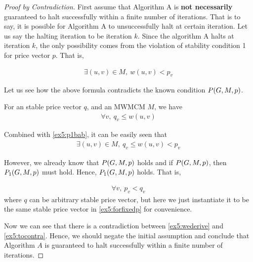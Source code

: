 \documentclass[11pt,a4paper]{article}
\begin{document}
\begin{proof}[Proof by Contradiction]
    First assume that Algorithm A is {\bf not necessarily} guaranteed to halt
    successfully within a finite number of iterations. That is to say, it is
    possible for Algorithm A to unsuccessfully halt at certain iteration. Let
    us say the halting iteration to be iteration $k$. Since the algorithm A
    halts at iteration $k$, the only possibility comes from the violation of stability
    condition 1 for price vector $p$. That is,
    
    \begin{align}  \label{ex5:p1bab}
        \exists (u,v) \in M,\ w(u,v) < p_v
    \end{align}

    Let us see how the above formula contradicts the known condition $P(G, M, p)$.

    For an stable price vector $q$, and an MWMCM $M$, we have
    \begin{align} \label{ex5:forfixedp}
        \forall v,\ q_v \leq w(u,v)
    \end{align}

    Combined with \eqref{ex5:p1bab}, it can be easily seen that 
    \begin{align} \label{ex5:wederive}
        \exists (u,v) \in M,\ q_v \leq w(u,v) < p_v
    \end{align}

    However, we already know that $P(G, M, p)$ holds and if $P(G, M, p)$, then $P_1(G, M, p)$ must
    hold.  Hence, $P_1(G, M, p)$ holds. That is,

    \begin{align} \label{ex5:tocontra}
        \forall v,\ p_v < q_v
    \end{align}
    where $q$ can be arbitrary stable price vector, but here we just
    instantiate it to be the same stable price vector in \eqref{ex5:forfixedp} for convenience.

    Now we can see that there is a contradiction between \eqref{ex5:wederive}
    and \eqref{ex5:tocontra}. Hence, we should negate the initial assumption
    and conclude that Algorithm $A$ is guaranteed to halt successfully within
    a finite number of iterations. 

\end{proof}
\end{document}
